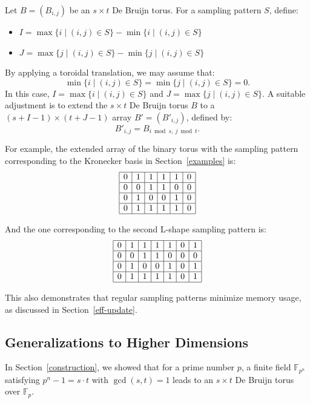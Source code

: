 \documentclass{article}
\begin{document}
Let $B = (B_{i,j})$ be an $s \times t$ De Bruijn torus. For a sampling pattern $S$, define:
\begin{itemize}
    \item $I = \max\{i \mid (i, j) \in S\} - \min\{i \mid (i, j) \in S\}$
    \item $J = \max\{j \mid (i, j) \in S\} - \min\{j \mid (i, j) \in S\}$
\end{itemize}

By applying a toroidal translation, we may assume that:
\[ \min\{i \mid (i, j) \in S\} = \min\{j \mid (i, j) \in S\} = 0. \]
In this case, $I = \max\{i \mid (i, j) \in S\}$ and $J = \max\{j \mid (i, j) \in S\}$. A suitable adjustment is to extend the $s \times t$ De Bruijn torus $B$ to a $(s + I - 1) \times (t + J - 1)$ array $B' = (B'_{i,j})$, defined by:
\[ B'_{i,j} = B_{i \bmod s,\ j \bmod t}. \]

For example, the extended array of the binary torus with the sampling pattern corresponding to the Kronecker basis in Section~\ref{examples} is:
\[
\begin{array}{|c|c|c|c|c|c|}
\hline
0 & 1 & 1 & 1 & 1 & 0 \\
\hline
0 & 0 & 1 & 1 & 0 & 0 \\
\hline
0 & 1 & 0 & 0 & 1 & 0 \\
\hline
0 & 1 & 1 & 1 & 1 & 0 \\
\hline
\end{array}
\]

And the one corresponding to the second L-shape sampling pattern is:
\[
\begin{array}{|c|c|c|c|c|c|c|}
\hline
0 & 1 & 1 & 1 & 1 & 0 & 1 \\
\hline
0 & 0 & 1 & 1 & 0 & 0 & 0 \\
\hline
0 & 1 & 0 & 0 & 1 & 0 & 1 \\
\hline
0 & 1 & 1 & 1 & 1 & 0 & 1 \\
\hline
\end{array}
\]

This also demonstrates that regular sampling patterns minimize memory usage, as discussed in Section~\ref{eff-update}.

\subsection{Generalizations to Higher Dimensions}
In Section~\ref{construction}, we showed that for a prime number $p$, a finite field $\mathbb{F}_{p^n}$ satisfying $p^n - 1 = s \cdot t$ with $\gcd(s, t) = 1$ leads to an $s \times t$ De Bruijn torus over $\mathbb{F}_p$.
\end{document}
